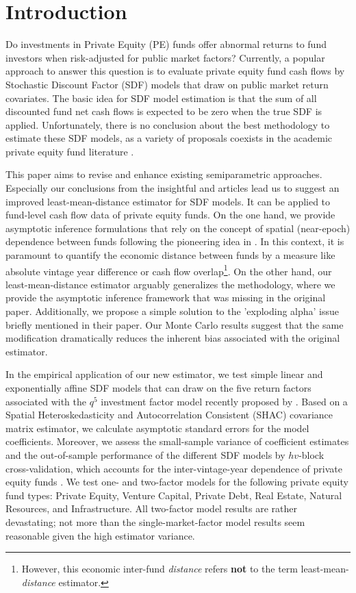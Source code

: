 \documentclass[12pt]{article}
\begin{document}
\section{Introduction}

Do investments in Private Equity (PE) funds offer abnormal returns to fund investors when risk-adjusted for public market factors?
Currently, a popular approach to answer this question is to evaluate private equity fund cash flows by Stochastic Discount Factor (SDF) models that draw on public market return covariates.
The basic idea for SDF model estimation is that the sum of all discounted fund net cash flows is expected to be zero when the true SDF is applied.
Unfortunately, there is no conclusion about the best methodology to estimate these SDF models, as a variety of proposals coexists in the academic private equity fund literature \citep{DLP12,B14,KN16,ACGP18,GSW19}.

This paper aims to revise and enhance existing semiparametric approaches.
Especially our conclusions from the insightful \cite{DLP12} and \cite{KN16} articles lead us to suggest an improved least-mean-distance estimator for SDF models.
It can be applied to fund-level cash flow data of private equity funds.
On the one hand, we provide asymptotic inference formulations that rely on the concept of spatial (near-epoch) dependence between funds following the pioneering idea in \cite{KN16}.
In this context, it is paramount to quantify the economic distance between funds by a measure like absolute vintage year difference or cash flow overlap\footnote{However, this economic inter-fund \emph{distance} refers \textbf{not} to the term least-mean-\emph{distance} estimator.}.
On the other hand, our least-mean-distance estimator arguably generalizes the \cite{DLP12} methodology, where we provide the asymptotic inference framework that was missing in the original paper.
Additionally, we propose a simple solution to the 'exploding alpha' issue briefly mentioned in their paper.
Our Monte Carlo results suggest that the same modification dramatically reduces the inherent bias associated with the original \cite{DLP12} estimator.

In the empirical application of our new estimator, we test simple linear and exponentially affine SDF models that can draw on the five return factors associated with the $q^5$ investment factor model recently proposed by \cite{HXZ20}.
Based on a Spatial Heteroskedasticity and Autocorrelation Consistent (SHAC) covariance matrix estimator, we calculate asymptotic standard errors for the model coefficients.
Moreover, we assess the small-sample variance of coefficient estimates and the out-of-sample performance of the different SDF models by $hv$-block cross-validation, which accounts for the inter-vintage-year dependence of private equity funds \citep{R00}.
We test one- and two-factor models for the following private equity fund types: Private Equity, Venture Capital, Private Debt, Real Estate, Natural Resources, and Infrastructure.
All two-factor model results are rather devastating; not more than the single-market-factor model results seem reasonable given the high estimator variance.
\end{document}
